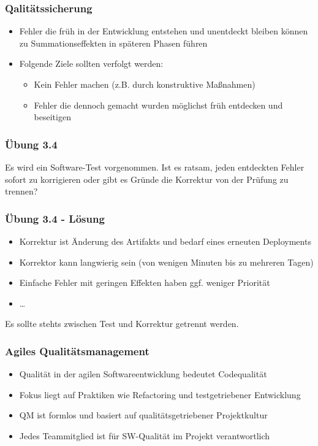 \begin{frame}
\frametitle{Qalitätssicherung}
	\begin{itemize}
		\item Fehler die früh in der Entwicklung entstehen und unentdeckt bleiben können zu Summationseffekten
		in späteren Phasen führen
		\item Folgende Ziele sollten verfolgt werden:
					\begin{itemize}
						\item Kein Fehler machen (z.B. durch konstruktive Maßnahmen)
						\item Fehler die dennoch gemacht wurden möglichst früh entdecken und beseitigen
					\end{itemize}
	\end{itemize}
\end{frame}

\begin{frame}
\frametitle{Übung 3.4}
	Es wird ein Software-Test vorgenommen. Ist es ratsam, jeden entdeckten Fehler sofort zu
	korrigieren oder gibt es Gründe die Korrektur von der Prüfung zu trennen?
\end{frame}

\ifloesung
\begin{frame}
\frametitle{Übung 3.4 - Lösung}
	\begin{itemize}
		\item Korrektur ist Änderung des Artifakts und bedarf eines erneuten Deployments
		\item Korrektor kann langwierig sein (von wenigen Minuten bis zu mehreren Tagen)
		\item Einfache Fehler mit geringen Effekten haben ggf. weniger Priorität
		\item \ldots
	\end{itemize}
	Es sollte stehts zwischen Test und Korrektur getrennt werden.
\end{frame}
\fi

\begin{frame}
\frametitle{Agiles Qualitätsmanagement}
	\begin{itemize}
		\item Qualität in der agilen Softwareentwicklung bedeutet Codequalität
		\item Fokus liegt auf Praktiken wie Refactoring und testgetriebener Entwicklung
		\item QM ist formlos und basiert auf qualitätsgetriebener Projektkultur
		\item Jedes Teammitglied ist für SW-Qualität im Projekt verantwortlich
	\end{itemize}
\end{frame}

